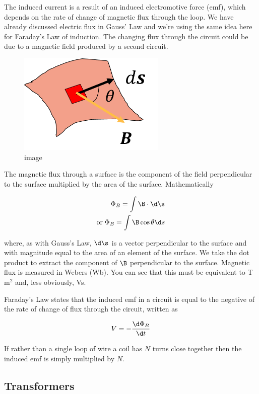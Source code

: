 \documentclass[
]{book}
\begin{document}
The induced current is a result of an induced electromotive force (emf),
which depends on the rate of change of magnetic flux through the loop.
We have already discussed electric flux in Gauss' Law and we're using
the same idea here for Faraday's Law of induction. The changing flux
through the circuit could be due to a magnetic field produced by a
second circuit.

\begin{figure}
\centering
\includegraphics[width=70mm,height=\textheight]{Figures/magFlux.png}
\caption{image}
\end{figure}

The magnetic flux through a surface is the component of the field
perpendicular to the surface multiplied by the area of the surface.
Mathematically

\[\begin{aligned}
\Phi_B = \int\B \cdot \d\s \\  
\text{or} \; \Phi_B = \int \B \cos\theta \d s
\end{aligned}\]

where, as with Gauss's Law, \(\d \s\) is a vector perpendicular to the
surface and with magnitude equal to the area of an element of the
surface. We take the dot product to extract the component of \(\B\)
perpendicular to the surface. Magnetic flux is measured in Webers (Wb).
You can see that this must be equivalent to T m\(^2\) and, less obviously,
Vs.

Faraday's Law states that the induced emf in a circuit is equal to the
negative of the rate of change of flux through the circuit, written as

\[\begin{aligned}
V = - \frac{\d \Phi_B}{\d t}
\end{aligned}\]

If rather than a single loop of wire a coil has \(N\) turns close together
then the induced emf is simply multiplied by \(N\).

\hypertarget{transformers}{%
\subsection{Transformers}\label{transformers}}
\end{document}
